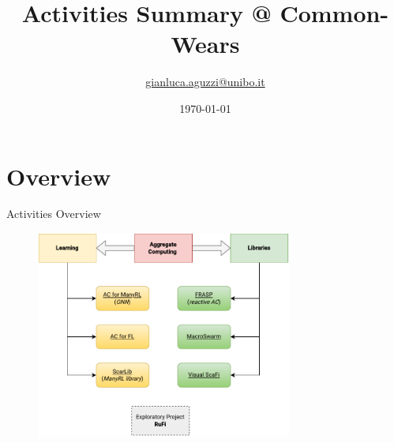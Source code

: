 \documentclass[presentation, 9pt, aspectratio=169]{beamer}\mode<presentation>{\usetheme{AMSBolognaFC}}
\title[Activities Summary]
{Activities Summary @ Common-Wears}
\author[\sspeaker{Aguzzi}]
{\speaker{Gianluca Aguzzi} \href{mailto:gianluca.aguzzi@unibo.it}{gianluca.aguzzi@unibo.it} \\
}
\institute[DISI, Univ.\ Bologna]
{%
\textsc{Alma Mater Studiorum} -- Universit{\`a} di Bologna \\[0.1cm]
\textbf{Talk @} \bold{Common Wears}\\[0.15cm]
}
\date[\today]{\today}
\begin{document}
\frame{\titlepage}

\section{Overview}
\begin{frame}[fragile]{Activities Overview}
	\begin{figure}
		\centering
		\includegraphics[width=0.75\textwidth]{img/activities-overview.drawio}
	\end{figure}
\end{frame}
\end{document}
